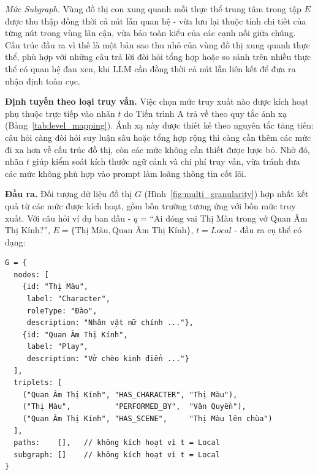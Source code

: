 \textit{Mức Subgraph.} Vùng đồ thị con xung quanh mỗi thực thể trung tâm trong tập $E$ được thu thập đồng thời cả nút lẫn quan hệ - vừa lưu lại thuộc tính chi tiết của từng nút trong vùng lân cận, vừa bảo toàn kiểu của các cạnh nối giữa chúng. Cấu trúc đầu ra vì thế là một bản sao thu nhỏ của vùng đồ thị xung quanh thực thể, phù hợp với những câu trả lời đòi hỏi tổng hợp hoặc so sánh trên nhiều thực thể có quan hệ đan xen, khi LLM cần đồng thời cả nút lẫn liên kết để đưa ra nhận định toàn cục.

\textbf{Định tuyến theo loại truy vấn.} Việc chọn mức truy xuất nào được kích hoạt phụ thuộc trực tiếp vào nhãn $t$ do Tiến trình A trả về theo quy tắc ánh xạ (Bảng~\ref{tab:level_mapping}). Ánh xạ này được thiết kế theo nguyên tắc tăng tiến: câu hỏi càng đòi hỏi suy luận sâu hoặc tổng hợp rộng thì càng cần thêm các mức đi xa hơn về cấu trúc đồ thị, còn các mức không cần thiết được lược bỏ. Nhờ đó, nhãn $t$ giúp kiểm soát kích thước ngữ cảnh và chi phí truy vấn, vừa tránh đưa các mức không phù hợp vào prompt làm loãng thông tin cốt lõi.

\begin{table}[ht]
  \centering
  \caption{Ánh xạ mức truy xuất theo loại truy vấn.}
  \label{tab:level_mapping}
\end{table}

\textbf{Đầu ra.} Đối tượng dữ liệu đồ thị $G$ (Hình~\ref{fig:multi_granularity}) hợp nhất kết quả từ các mức được kích hoạt, gồm bốn trường tương ứng với bốn mức truy xuất. Với câu hỏi ví dụ ban đầu - $q$ = ``Ai đóng vai Thị Màu trong vở Quan Âm Thị Kính?'', $E = \{\text{Thị Màu}, \text{Quan Âm Thị Kính}\}$, $t = \textit{Local}$ - đầu ra cụ thể có dạng:

\begin{tcolorbox}[colback=gray!5, colframe=black!50, arc=4pt, boxrule=0.5pt]
{\small
\begin{verbatim}
G = {
  nodes: [
    {id: "Thị Màu",
     label: "Character",
     roleType: "Đào",
     description: "Nhân vật nữ chính ..."},
    {id: "Quan Âm Thị Kính",
     label: "Play",
     description: "Vở chèo kinh điển ..."}
  ],
  triplets: [
    ("Quan Âm Thị Kính", "HAS_CHARACTER", "Thị Màu"),
    ("Thị Màu",          "PERFORMED_BY",  "Vân Quyền"),
    ("Quan Âm Thị Kính", "HAS_SCENE",     "Thị Màu lên chùa")
  ],
  paths:    [],   // không kích hoạt vì t = Local
  subgraph: []    // không kích hoạt vì t = Local
}
\end{verbatim}
}
\end{tcolorbox}

